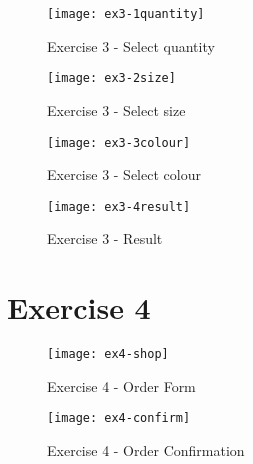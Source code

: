 \clearpage
\captionsetup{type=figure}


\clearpage
\captionsetup{type=figure}


\captionsetup{type=figure}


\begin{figure}[H]
  \caption{Exercise 3 - Select quantity}
  \centering
  \texttt{[image: ex3-1quantity]}
\end{figure}

\begin{figure}[H]
  \caption{Exercise 3 - Select size}
  \centering
  \texttt{[image: ex3-2size]}
\end{figure}

\begin{figure}[H]
  \caption{Exercise 3 - Select colour}
  \centering
  \texttt{[image: ex3-3colour]}
\end{figure}

\begin{figure}[H]
  \caption{Exercise 3 - Result}
  \centering
  \texttt{[image: ex3-4result]}
\end{figure}

\clearpage
\section{Exercise 4}

\begin{figure}[H]
  \caption{Exercise 4 - Order Form}
  \centering
  \texttt{[image: ex4-shop]}
\end{figure}

\begin{figure}[H]
  \caption{Exercise 4 - Order Confirmation}
  \centering
  \texttt{[image: ex4-confirm]}
\end{figure}
